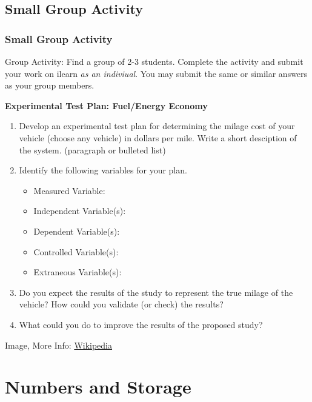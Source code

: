 \documentclass[fleqn]{beamer} %
\newcommand{\sectionIVtitle}{Numbers and Storage}
\newcommand{\sectionIIIsubsectionVtitle}{Small Group Activity}
\begin{document}
		\subsection{\sectionIIIsubsectionVtitle}\label{sectionIIIsubsectionV}

			\begin{frame}
				\frametitle{\sectionIIIsubsectionVtitle}
				\tiny

				Group Activity: Find a group of 2-3 students. Complete the activity and submit your work on ilearn {\it as an indiviual}. You may submit the same or similar answers as your group members.	

				\begin{multicols}{2}
					\textbf{Experimental Test Plan: Fuel/Energy Economy} \\

					\begin{enumerate}
						\item Develop an experimental test plan for determining the milage cost of your vehicle (choose any vehicle) in dollars per mile. Write a short desciption of the system. (paragraph or bulleted list)
						\vspace{5mm}
						\item Identify the following variables for your plan.

						\begin{multicols}{2}
							\begin{itemize}\tiny
								\item Measured Variable: 
								\item Independent Variable(s): 
								\item Dependent Variable(s): 
								\item Controlled Variable(s): 
								\item Extraneous Variable(s):
							\end{itemize}
						\end{multicols}	

						\vspace{12mm}
						\item Do you expect the results of the study to represent the true milage of the vehicle? How could you validate (or check) the results?
						\item What could you do to improve the results of the proposed study?

					\end{enumerate}
				\end{multicols}	

				{\tiny Image, More Info: \href{https://en.wikipedia.org/wiki/Thermocouple}{Wikipedia} }\hspace{40mm} 

			\end{frame}			


	\section{\sectionIVtitle}\label{sectionIV}
\end{document}
